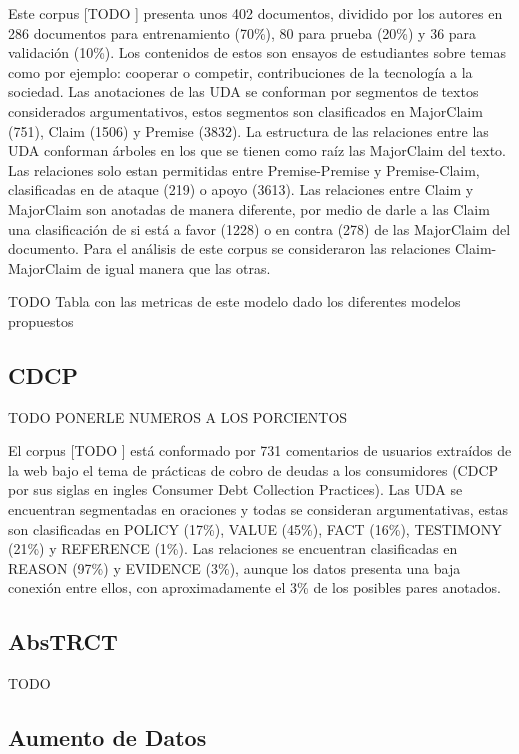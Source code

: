 Este corpus [TODO \cite{CORPUS PAPER}] presenta unos 402 documentos, dividido por los autores en 286 documentos para entrenamiento (70\%), 
80 para prueba (20\%) y 36 para validación (10\%). Los contenidos de estos son ensayos de estudiantes sobre temas
como por ejemplo: cooperar o competir, contribuciones de la tecnología a la sociedad.
Las anotaciones de las UDA se conforman por segmentos 
de textos considerados argumentativos, estos segmentos son clasificados en MajorClaim (751), Claim (1506) y Premise (3832).
La estructura de las relaciones entre las UDA conforman árboles en los que se tienen como raíz las 
MajorClaim del texto. Las relaciones solo estan permitidas entre Premise-Premise y Premise-Claim, clasificadas
en de ataque (219) o apoyo (3613). Las relaciones entre Claim y MajorClaim son anotadas de manera diferente, por medio de 
darle a las Claim una clasificación de si está a favor (1228) o en contra (278) de las MajorClaim del documento.
Para el análisis de este corpus se consideraron las relaciones Claim-MajorClaim de igual manera que las otras.

TODO Tabla con las metricas de este modelo dado los diferentes modelos propuestos

\subsection{CDCP}\label{corpus:cdcp}

TODO PONERLE NUMEROS A LOS PORCIENTOS

El corpus [TODO \cite{CORPUS PAPER}] está conformado por 731 comentarios de usuarios extraídos de la web bajo el tema de 
prácticas de cobro de deudas a los consumidores (CDCP por sus siglas en ingles Consumer Debt Collection Practices).
Las UDA se encuentran segmentadas en oraciones y todas se consideran argumentativas, estas son clasificadas en 
POLICY (17\%), VALUE (45\%), FACT (16\%), TESTIMONY (21\%) y REFERENCE (1\%). Las relaciones se encuentran 
clasificadas en REASON (97\%) y EVIDENCE (3\%), aunque los datos presenta una baja conexión entre ellos, con 
aproximadamente el 3\% de los posibles pares anotados.

\subsection{AbsTRCT}

TODO 

\subsection{Aumento de Datos}

